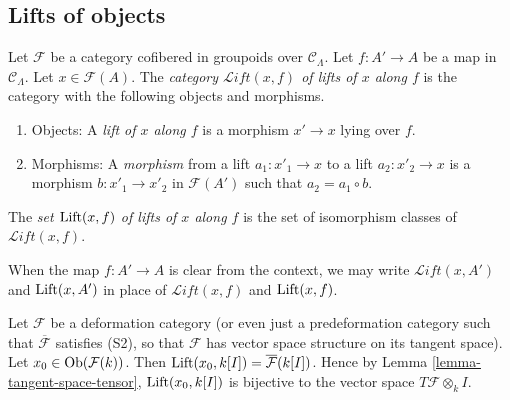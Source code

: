 \subsection{Lifts of objects}
\begin{definition}
\label{definition-lifts}
Let $\mathcal F$ be a category cofibered in groupoids over $\mathcal 
C_{\Lambda}$.  Let $f: A' \rightarrow A$ be a map in $\mathcal C_{\Lambda}$.  
Let $x \in \mathcal F(A)$.  The \emph{category $\mathcal{L}\textit{ift}(x,f)$ 
of lifts of $x$ along $f$} is the category with the following objects and 
morphisms. 
\begin{enumerate}
\item Objects: A \emph{lift of $x$ along $f$} is a morphism $x' \rightarrow x$ 
lying over $f$.  
\item Morphisms: A \emph{morphism} from a lift $a_1: x'_{1} \rightarrow x$ to a 
lift $a_2: x'_{2} \rightarrow x$ is a morphism $b: x'_1 \rightarrow x'_2$ in 
$\mathcal F(A')$ such that $a_2 = a_1 \circ b$.
\end{enumerate}
The \emph{set $\textnormal{Lift}(x,f)$ of lifts of $x$ along $f$} is the set of 
isomorphism classes of $\mathcal{L}\textit{ift}(x,f)$.
\end{definition}

\begin{remark}
When the map $f: A' \rightarrow A$ is clear from the context, we may write 
$\mathcal{L}\textit{ift}(x,A')$ and $\textnormal{Lift}(x,A')$ in place of 
$\mathcal{L}\textit{ift}(x,f)$ and $\textnormal{Lift}(x,f)$. 
\end{remark}

\begin{remark}
\label{remark-tangent-space-lifting}
Let $\mathcal F$ be a deformation category (or even just a predeformation 
category such that $\overline{\mathcal F}$ satisfies (S2), so that $\mathcal F$ 
has vector space structure on its tangent space).  Let $x_0 \in 
\textnormal{Ob}(\mathcal F(k))$.  Then $\textnormal{Lift}(x_0, k[I]) = 
\overline{\mathcal F}(k[I])$. Hence by Lemma \ref{lemma-tangent-space-tensor}, 
$\textnormal{Lift}(x_0, k[I])$ is bijective to the vector space $T\mathcal F 
\otimes_{k} I$.
\end{remark}

